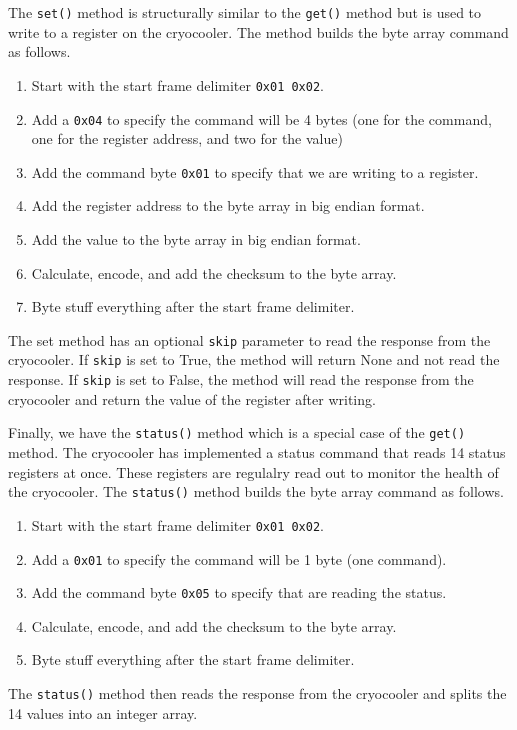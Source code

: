 The \texttt{set()} method is structurally similar to the \texttt{get()} method but is used to write to a register on the cryocooler.
The method builds the byte array command as follows.
\begin{enumerate}
    \item Start with the start frame delimiter \texttt{0x01 0x02}.
    \item Add a \texttt{0x04} to specify the command will be 4 bytes (one for the command, one for the register address, and two for the value)
    \item Add the command byte \texttt{0x01} to specify that we are writing to a register.
    \item Add the register address to the byte array in big endian format.
    \item Add the value to the byte array in big endian format.
    \item Calculate, encode, and add the checksum to the byte array.
    \item Byte stuff everything after the start frame delimiter.
\end{enumerate}
The set method has an optional \texttt{skip} parameter to read the response from the cryocooler.
If \texttt{skip} is set to True, the method will return None and not read the response.
If \texttt{skip} is set to False, the method will read the response from the cryocooler and return the value of the register after writing.

Finally, we have the \texttt{status()} method which is a special case of the \texttt{get()} method.
The cryocooler has implemented a status command that reads 14 status registers at once.
These registers are regulalry read out to monitor the health of the cryocooler.
The \texttt{status()} method builds the byte array command as follows.
\begin{enumerate}
    \item Start with the start frame delimiter \texttt{0x01 0x02}.
    \item Add a \texttt{0x01} to specify the command will be 1 byte (one command).
    \item Add the command byte \texttt{0x05} to specify that are reading the status.
    \item Calculate, encode, and add the checksum to the byte array.
    \item Byte stuff everything after the start frame delimiter.
\end{enumerate}
The \texttt{status()} method then reads the response from the cryocooler and splits the 14 values into an integer array. 

